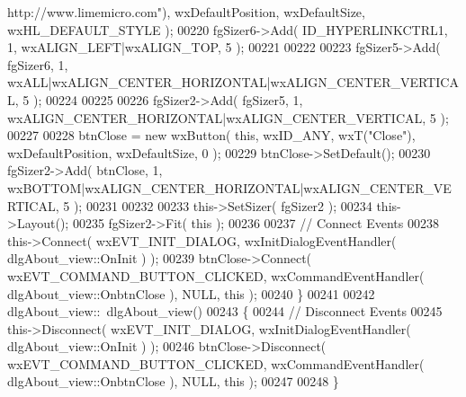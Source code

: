 \begin{DoxyCode}
{      http://www.limemicro.com"}), wxDefaultPosition, wxDefaultSize, wxHL\_DEFAULT\_STYLE );
00220     fgSizer6->Add( ID_HYPERLINKCTRL1, 1, wxALIGN\_LEFT|wxALIGN\_TOP, 5 );
00221     
00222     
00223     fgSizer5->Add( fgSizer6, 1, wxALL|wxALIGN\_CENTER\_HORIZONTAL|wxALIGN\_CENTER\_VERTICAL, 5 );
00224     
00225     
00226     fgSizer2->Add( fgSizer5, 1, wxALIGN\_CENTER\_HORIZONTAL|wxALIGN\_CENTER\_VERTICAL, 5 );
00227     
00228     btnClose = \textcolor{keyword}{new} wxButton( \textcolor{keyword}{this}, wxID\_ANY, wxT(\textcolor{stringliteral}{"Close"}), wxDefaultPosition, wxDefaultSize, 0 );
00229     btnClose->SetDefault(); 
00230     fgSizer2->Add( btnClose, 1, wxBOTTOM|wxALIGN\_CENTER\_HORIZONTAL|wxALIGN\_CENTER\_VERTICAL, 5 );
00231     
00232     
00233     this->SetSizer( fgSizer2 );
00234     this->Layout();
00235     fgSizer2->Fit( \textcolor{keyword}{this} );
00236     
00237     \textcolor{comment}{// Connect Events}
00238     this->Connect( wxEVT\_INIT\_DIALOG, wxInitDialogEventHandler( 
      dlgAbout_view::OnInit ) );
00239     btnClose->Connect( wxEVT\_COMMAND\_BUTTON\_CLICKED, wxCommandEventHandler( 
      dlgAbout_view::OnbtnClose ), NULL, \textcolor{keyword}{this} );
00240 \}
00241 
00242 dlgAbout_view::~dlgAbout_view()
00243 \{
00244     \textcolor{comment}{// Disconnect Events}
00245     this->Disconnect( wxEVT\_INIT\_DIALOG, wxInitDialogEventHandler( 
      dlgAbout_view::OnInit ) );
00246     btnClose->Disconnect( wxEVT\_COMMAND\_BUTTON\_CLICKED, wxCommandEventHandler( 
      dlgAbout_view::OnbtnClose ), NULL, \textcolor{keyword}{this} );
00247     
00248 \}
\end{DoxyCode}
